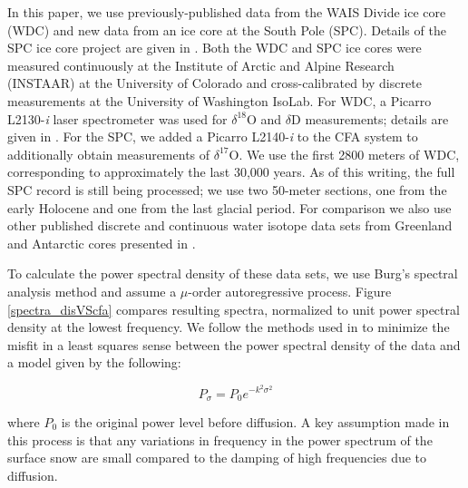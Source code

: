 \documentclass[draft, jgrga]{AGUTeX}
\begin{document}
\begin{article}
In this paper, we use previously-published data from the WAIS Divide ice core (WDC) \citep{Jones2017b} and new data from an ice core at the South Pole (SPC). Details of the SPC ice core project are given in \citep{Casey2014}. Both the WDC and SPC ice cores were measured continuously at the Institute of Arctic and Alpine Research (INSTAAR) at the University of Colorado and cross-calibrated by discrete measurements at the University of Washington IsoLab. For WDC, a Picarro L2130-\textit{i} laser spectrometer was used for $\delta^{18}$O and $\delta$D measurements; details are given in \citet{Jones2017b}.  For the SPC, we added a Picarro L2140-\textit{i} \citep{Steig2014} to the CFA system to additionally obtain measurements of $\delta^{17}$O. We use the first 2800 meters of WDC, corresponding to approximately the last 30,000 years. As of this writing, the full SPC record is still being processed; we use two 50-meter sections, one from the early Holocene and one from the last glacial period. For comparison we also use other published discrete and continuous water isotope data sets from Greenland and Antarctic cores presented in \citet{Oerter2004,Gkinis2011a,Steig2013,Svensson2015,Holme2017}.

To calculate the power spectral density of these data sets, we use Burg's spectral analysis method and assume a $\mu$-order autoregressive process. Figure \ref{spectra_disVScfa} compares resulting spectra, normalized to unit power spectral density at the lowest frequency. We follow the methods used in \citet{Gkinis2014} to minimize the misfit in a least squares sense between the power spectral density of the data and a model given by the following:

\begin{equation}
  \label{exp_model}
  P_\sigma=P_0e^{-k^2\sigma^2}
\end{equation}

where $P_0$ is the original power level before diffusion. A key assumption made in this process is that any variations in frequency in the power spectrum of the surface snow are small compared to the damping of high frequencies due to diffusion.


\end{article}
\end{document}
